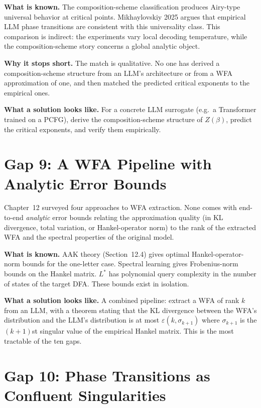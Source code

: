 \textbf{What is known.} The composition-scheme classification produces Airy-type universal behavior at critical points. Mikhaylovskiy 2025 \cite{Mikhaylovskiy2025} argues that empirical LLM phase transitions are consistent with this universality class.
This comparison is indirect: the experiments vary local decoding temperature, while the composition-scheme story concerns a global analytic object.

\textbf{Why it stops short.} The match is qualitative. No one has derived a composition-scheme structure from an LLM's architecture or from a WFA approximation of one, and then matched the predicted critical exponents to the empirical ones.

\textbf{What a solution looks like.} For a concrete LLM surrogate (e.g.\ a Transformer trained on a PCFG), derive the composition-scheme structure of $Z(\beta)$, predict the critical exponents, and verify them empirically.

\section{Gap 9: A WFA Pipeline with Analytic Error Bounds}
\label{ch18:gap9}

Chapter~12 surveyed four approaches to WFA extraction. None comes with end-to-end \emph{analytic} error bounds relating the approximation quality (in KL divergence, total variation, or Hankel-operator norm) to the rank of the extracted WFA and the spectral properties of the original model.

\textbf{What is known.} AAK theory (Section~12.4) gives optimal Hankel-operator-norm bounds for the one-letter case. Spectral learning gives Frobenius-norm bounds on the Hankel matrix. $L^*$ has polynomial query complexity in the number of states of the target DFA. These bounds exist in isolation.

\textbf{What a solution looks like.} A combined pipeline: extract a WFA of rank $k$ from an LLM, with a theorem stating that the KL divergence between the WFA's distribution and the LLM's distribution is at most $\varepsilon(k,\sigma_{k+1})$ where $\sigma_{k+1}$ is the $(k+1)$st singular value of the empirical Hankel matrix. This is the most tractable of the ten gaps.

\section{Gap 10: Phase Transitions as Confluent Singularities}
\label{ch18:gap10}

